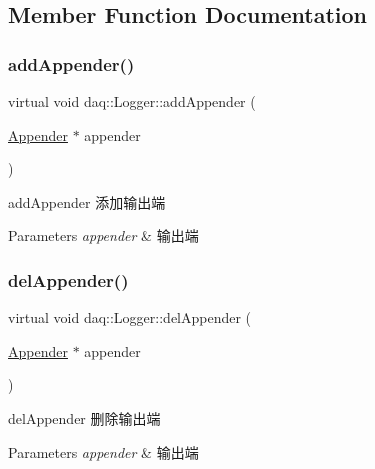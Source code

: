 \subsection{Member Function Documentation}
\mbox{\label{classdaq_1_1Logger_a01e9511b12a573dcdfde97065faf8d08}} 
\subsubsection{\texorpdfstring{add\+Appender()}{addAppender()}}
{\footnotesize\ttfamily virtual void daq\+::\+Logger\+::add\+Appender (\begin{DoxyParamCaption}\item[{\hyperlink{classdaq_1_1Appender}{Appender} $\ast$}]{appender }\end{DoxyParamCaption})\hspace{0.3cm}{\ttfamily [virtual]}}



add\+Appender 添加输出端 


\begin{DoxyParams}{Parameters}
{\em appender} & 输出端 \\
\hline
\end{DoxyParams}
\mbox{\label{classdaq_1_1Logger_aefc5c7cc5ef32470682f6f5d9bf091a0}} 
\subsubsection{\texorpdfstring{del\+Appender()}{delAppender()}}
{\footnotesize\ttfamily virtual void daq\+::\+Logger\+::del\+Appender (\begin{DoxyParamCaption}\item[{\hyperlink{classdaq_1_1Appender}{Appender} $\ast$}]{appender }\end{DoxyParamCaption})\hspace{0.3cm}{\ttfamily [virtual]}}



del\+Appender 删除输出端 


\begin{DoxyParams}{Parameters}
{\em appender} & 输出端 \\
\hline
\end{DoxyParams}
\mbox{\label{classdaq_1_1Logger_ab68517334c0cf8be05b5aeee56d8f2f4}} 
